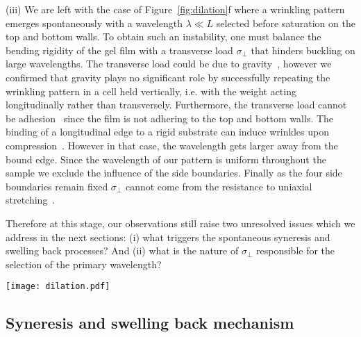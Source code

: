 \documentclass[twocolumn,superscriptaddress,showpacs,preprintnumbers, amsmath,amssymb,prl]{revtex4-1}
\begin{document}
\noindent
(iii) We are left with the case of Figure~\ref{fig:dilation}f where a wrinkling pattern emerges spontaneously with a wavelength $\lambda\ll L$ selected before saturation on the top and bottom walls. To obtain such an instability, one must balance the bending rigidity of the gel film with a transverse load $\sigma_{\perp}$ that hinders buckling on large wavelengths. The transverse load could be due to gravity~\cite{Smoluchowski1910, Kolinski2009, Vella2009, Pineirua2013, Lucantonio2013}, however we confirmed that gravity plays no significant role by successfully repeating the wrinkling pattern in a cell held vertically, i.e. with the weight acting longitudinally rather than transversely. Furthermore, the transverse load cannot be adhesion~\cite{Vella2009a} since the film is not adhering to the top and bottom walls. 
%
The binding of a longitudinal edge to a rigid substrate can induce wrinkles upon compression~\cite{Vandeparre2011a, Li2013}. However in that case, the wavelength gets larger away from the bound edge. Since the wavelength of our pattern is uniform throughout the sample we exclude the influence of the side boundaries.
%
%
Finally as the four side boundaries remain fixed $\sigma_{\perp}$ cannot come from the resistance to uniaxial stretching~\cite{Cerda2003}.

Therefore at this stage, our observations still raise two unresolved issues which we address in the next sections: (i) what triggers the spontaneous syneresis and swelling back processes? And (ii) what is the nature of $\sigma_{\perp}$ responsible for the selection of the primary wavelength?

\begin{figure*}
\texttt{[image: dilation.pdf]}
\caption{The wrinkling experiment. (a) Initial configuration where the sealed cell contains a homogeneous protein solution. (b) Around the isoelectric pH, the gel forms and immediately expels solvent leading to (c). If tensile stresses were not released we would observe reversible swelling back leading to (d) a flat swollen gel layer. If tensile stresses are released, swelling back leads either to buckling (e) or to wrinkling (f) depending on whether the bending is free or hindered by a transverse load.}
\label{fig:dilation}
\end{figure*}

\subsection*{Syneresis and swelling back mechanism}
\end{document}

